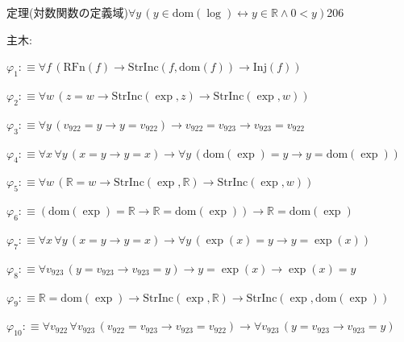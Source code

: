 \begin{fullproof}{定理(対数関数の定義域)}{$\forall y\,(y \in \mathrm{dom}(\log) \leftrightarrow y \in \mathbb{R} \land 0 < y)$}{206}
\begin{ptree}
\end{ptree}
\noindent 主木:
\begin{ptree}
\noLine
{}
\noLine
{}
\end{ptree}
\begin{abbrevlist}
\item $\varphi_{1} :\equiv \forall f\,(\mathrm{RFn}(f) \to \mathrm{StrInc}(f,\mathrm{dom}(f)) \to \mathrm{Inj}(f))$
\item $\varphi_{2} :\equiv \forall w\,(z = w \to \mathrm{StrInc}(\exp,z) \to \mathrm{StrInc}(\exp,w))$
\item $\varphi_{3} :\equiv \forall y\,(v_{922} = y \to y = v_{922}) \to v_{922} = v_{923} \to v_{923} = v_{922}$
\item $\varphi_{4} :\equiv \forall x\,\forall y\,(x = y \to y = x) \to \forall y\,(\mathrm{dom}(\exp) = y \to y = \mathrm{dom}(\exp))$
\item $\varphi_{5} :\equiv \forall w\,(\mathbb{R} = w \to \mathrm{StrInc}(\exp,\mathbb{R}) \to \mathrm{StrInc}(\exp,w))$
\item $\varphi_{6} :\equiv (\mathrm{dom}(\exp) = \mathbb{R} \to \mathbb{R} = \mathrm{dom}(\exp)) \to \mathbb{R} = \mathrm{dom}(\exp)$
\item $\varphi_{7} :\equiv \forall x\,\forall y\,(x = y \to y = x) \to \forall y\,(\exp(x) = y \to y = \exp(x))$
\item $\varphi_{8} :\equiv \forall v_{923}\,(y = v_{923} \to v_{923} = y) \to y = \exp(x) \to \exp(x) = y$
\item $\varphi_{9} :\equiv \mathbb{R} = \mathrm{dom}(\exp) \to \mathrm{StrInc}(\exp,\mathbb{R}) \to \mathrm{StrInc}(\exp,\mathrm{dom}(\exp))$
\item $\varphi_{10} :\equiv \forall v_{922}\,\forall v_{923}\,(v_{922} = v_{923} \to v_{923} = v_{922}) \to \forall v_{923}\,(y = v_{923} \to v_{923} = y)$

\end{abbrevlist}
\end{fullproof}
